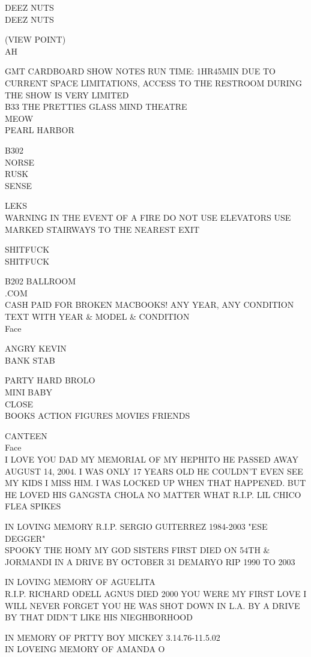 \documentclass[10pt,letterpaper]{article}
\begin{document}
DEEZ NUTS\\
DEEZ NUTS

(VIEW POINT)\\
AH

GMT CARDBOARD SHOW NOTES RUN TIME: 1HR45MIN DUE TO CURRENT SPACE LIMITATIONS, ACCESS TO THE RESTROOM DURING THE SHOW IS VERY LIMITED\\
B33 THE PRETTIES GLASS MIND THEATRE\\
MEOW\\
PEARL HARBOR

B302\\
NORSE\\
RUSK\\
SENSE

LEKS\\
WARNING IN THE EVENT OF A FIRE DO NOT USE ELEVATORS USE MARKED STAIRWAYS TO THE NEAREST EXIT

SHITFUCK\\
SHITFUCK

B202 BALLROOM\\
.COM\\
CASH PAID FOR BROKEN MACBOOKS!  ANY YEAR, ANY CONDITION TEXT WITH YEAR \& MODEL \& CONDITION\\
Face

ANGRY KEVIN\\
BANK STAB

PARTY HARD BROLO\\
MINI BABY\\
CLOSE\\
BOOKS ACTION FIGURES MOVIES FRIENDS

CANTEEN\\
Face\\
I LOVE YOU DAD MY MEMORIAL OF MY HEPHITO HE PASSED AWAY AUGUST 14, 2004.  I WAS ONLY 17 YEARS OLD HE COULDN'T EVEN SEE MY KIDS I MISS HIM.  I WAS LOCKED UP WHEN THAT HAPPENED.  BUT HE LOVED HIS GANGSTA CHOLA NO MATTER WHAT R.I.P. LIL CHICO FLEA SPIKES

IN LOVING MEMORY R.I.P. SERGIO GUITERREZ 1984{-}2003 "ESE DEGGER"\\
SPOOKY THE HOMY MY GOD SISTERS FIRST DIED ON 54TH \& JORMANDI IN A DRIVE BY OCTOBER 31 DEMARYO RIP 1990 TO 2003

IN LOVING MEMORY OF AGUELITA\\
R.I.P. RICHARD ODELL AGNUS DIED 2000 YOU WERE MY FIRST LOVE I WILL NEVER FORGET YOU HE WAS SHOT DOWN IN L.A. BY A DRIVE BY THAT DIDN'T LIKE HIS NIEGHBORHOOD

IN MEMORY OF PRTTY BOY MICKEY 3.14.76{-}11.5.02\\
IN LOVEING MEMORY OF AMANDA O
\end{document}
